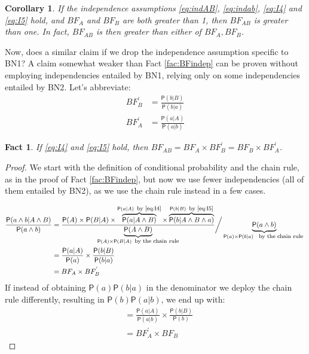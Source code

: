 \documentclass[
  10pt,
  dvipsnames,enabledeprecatedfontcommands]{scrartcl}
\newtheorem{fact}{Fact}
\newcommand{\et}{\wedge}
\newcommand{\pr}[1]{\ensuremath{\mathsf{P}(#1)}}
\newtheorem{corollary}{Corollary}[fact]
\begin{document}
\begin{corollary} If the independence assumptions \eqref{eq:indAB}, \eqref{eq:indab}, \eqref{eq:I4} and \eqref{eq:I5} hold, and $BF_{A}$ and $BF_{B}$ are both greater than 1, then $BF_{AB}$ is greater than one. In fact,  $BF_{AB}$ is then greater than either of $BF_{A}, BF_{B}$. \label{cor:BFind2}
\end{corollary}

Now, does a similar claim if we drop the independence assumption
specific to \textsf{BN1}? A claim somewhat weaker than Fact
\ref{fac:BFindep} can be proven without employing independencies
entailed by \textsf{BN1}, relying only on some independencies entailed
by \textsf{BN2}. Let's abbreviate: \begin{align*}
BF^{'}_{B} & = \frac{\pr{b \vert B}}{\pr{b\vert a}} \\
BF^{'}_{A} & = \frac{\pr{a \vert A}}{\pr{a \vert b}}
\end{align*}

\begin{fact} If \eqref{eq:I4} and \eqref{eq:I5}  hold, then $BF_{AB} =  BF_{A}\times BF^{'}_{B}  = BF_{B} \times BF^{'}_{A}$. \label{fac:BFdep}
\end{fact}

\begin{proof}

We start with the definition of conditional probability and the chain rule, as in the proof of Fact \ref{fac:BFindep}, but now we use fewer  independencies (all of them entailed by \textsf{BN2}), as we use the chain rule instead in a few cases. 

 \begin{align*}
\frac{\pr{a \wedge b\vert A\wedge B}}{\pr{a \wedge b}} &
= \frac{\pr{A} \times \pr {B \vert A}  \times
\overbrace{\pr{a \vert A \et B}}^{\pr{a \vert A} \mbox{\footnotesize \, by \eqref{eq:I4}}}
\times \overbrace{\pr{b \vert A \et B \et a}}^{\pr{b \vert B} \mbox{\footnotesize \, by \eqref{eq:I5}}}
}{\underbrace{\pr{A \et B}}_{\pr{A} \times \pr{B\vert A} \mbox{\footnotesize \, by the chain rule}}} \bigg/ \underbrace{\pr{a \wedge b}}_{\pr{a}\times \pr{b\vert a} \mbox{ \footnotesize \, by the chain rule }}\\
& = \frac{\pr{a \vert A}}{\pr{a}} \times \frac{\pr{b\vert B}}{\pr{b \vert a}}\\
& = BF_{A} \times BF^{'}_{B}
\end{align*}
If instead of obtaining $\pr{a}\pr{b \vert a}$ in the denominator we deploy the chain rule differently, resulting in $\pr{b}\pr{a \vert b}$, we end up with:
\begin{align*}
& = \frac{\pr{a \vert A}}{\pr{a \vert b}} \times \frac{\pr{b\vert B}}{\pr{b}}\\
& = BF^{'}_{A} \times BF_{B}
\end{align*}

\end{proof}
\end{document}

